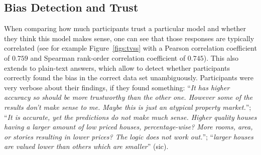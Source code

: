\subsection{Bias Detection and Trust}
\vspace*{-0.5em}
When comparing how much participants trust a particular model and whether they think this model makes sense, one can see that those responses are typically correlated (see for example Figure~\ref{figs:tvss} with a Pearson correlation coefficient of $0.759$ and Spearman rank-order correlation coefficient of $0.745$).
This also extends to plain-text answers, which allow to detect whether participants correctly found the bias in the correct data set unambiguously.
Participants were very verbose about their findings, if they found something:
``\emph{It has higher accuracy so should be more trustworthy than the other one. However some of the results don't make sense to me. Maybe this is just an atypical property market.}'';
``\emph{It is accurate, yet the predictions do not make much sense. Higher quality houses having a larger amount of low priced houses, percentage-wise? More rooms, area, or stories resulting in lower prices? The logic does not work out.}'';
``\emph{larger houses are valued lower than others which are smaller}'' (sic).

